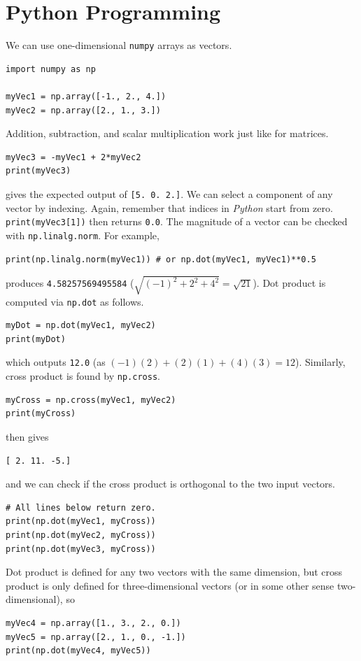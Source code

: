 \section{Python Programming}
\label{section:ch4python}
We can use one-dimensional \verb|numpy| arrays as vectors. 
\begin{lstlisting}
import numpy as np

myVec1 = np.array([-1., 2., 4.])
myVec2 = np.array([2., 1., 3.])
\end{lstlisting}
Addition, subtraction, and scalar multiplication work just like for matrices.
\begin{lstlisting}
myVec3 = -myVec1 + 2*myVec2
print(myVec3)
\end{lstlisting}
gives the expected output of \verb|[5. 0. 2.]|. We can select a component of any vector by indexing. Again, remember that indices in \textit{Python} start from zero. \verb|print(myVec3[1])| then returns \verb|0.0|. The magnitude of a vector can be checked with \verb|np.linalg.norm|. For example,
\begin{lstlisting}
print(np.linalg.norm(myVec1)) # or np.dot(myVec1, myVec1)**0.5   
\end{lstlisting}
produces \verb|4.58257569495584| ($\sqrt{(-1)^2 + 2^2 + 4^2} = \sqrt{21}$). Dot product is computed via \verb|np.dot| as follows.
\begin{lstlisting}
myDot = np.dot(myVec1, myVec2)
print(myDot)
\end{lstlisting}
which outputs \verb|12.0| (as $(-1)(2) + (2)(1) + (4)(3) = 12$). Similarly, cross product is found by \verb|np.cross|.
\begin{lstlisting}
myCross = np.cross(myVec1, myVec2)
print(myCross)
\end{lstlisting}
then gives
\begin{lstlisting}
[ 2. 11. -5.]   
\end{lstlisting}
and we can check if the cross product is orthogonal to the two input vectors.
\begin{lstlisting}
# All lines below return zero.
print(np.dot(myVec1, myCross))
print(np.dot(myVec2, myCross))
print(np.dot(myVec3, myCross))
\end{lstlisting}
Dot product is defined for any two vectors with the same dimension, but cross product is only defined for three-dimensional vectors (or in some other sense two-dimensional), so
\begin{lstlisting}
myVec4 = np.array([1., 3., 2., 0.])
myVec5 = np.array([2., 1., 0., -1.])
print(np.dot(myVec4, myVec5))
\end{lstlisting}
